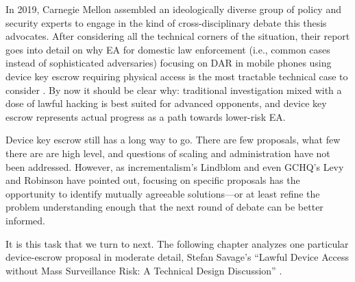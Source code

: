 In 2019, Carnegie Mellon assembled an ideologically diverse group of policy and security experts to engage in the kind
of cross-disciplinary debate this thesis advocates. After considering all the technical corners of the situation, their
report goes into detail on why \ac{EA} for domestic law enforcement (i.e., common cases instead of sophisticated
adversaries) focusing on \ac{DAR} in mobile phones using device key escrow requiring physical access is the most
tractable technical case to consider \cite{group_2019}. By now it should be clear why: traditional investigation mixed
with a dose of lawful hacking is best suited for advanced opponents, and device key escrow represents actual progress as
a path towards lower-risk \ac{EA}.

Device key escrow still has a long way to go. There are few proposals, what few there are are high level, and questions
of scaling and administration have not been addressed. However, as \ac{incrementalism}'s Lindblom and even \ac{GCHQ}'s
Levy and Robinson have pointed out, focusing on specific proposals has the opportunity to identify mutually agreeable
solutions---or at least refine the problem understanding enough that the next round of debate can be better informed.

It is this task that we turn to next. The following chapter analyzes one particular device-escrow proposal in moderate
detail, Stefan Savage's ``Lawful Device Access without Mass Surveillance Risk: A Technical Design Discussion''
\cite{savage_lawful_2018}.




